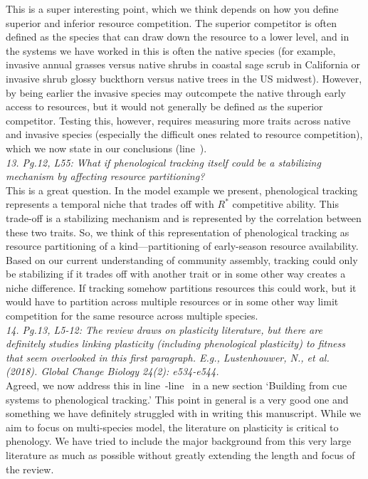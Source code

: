 \documentclass[11pt]{article}
\newcommand{\lr}[1]{line~\lineref{#1}}
\begin{document}
This is a super interesting point, which we think depends on how you define superior and inferior resource competition. The superior competitor is often defined as the species that can draw down the resource to a lower level, and in the systems we have worked in this is often the native species (for example, invasive annual grasses versus native shrubs in coastal sage scrub in California or invasive shrub glossy buckthorn versus native trees in the US midwest). However, by being earlier the invasive species may outcompete the native through early access to resources, but it would not generally be defined as the superior competitor. Testing this, however, requires measuring more traits across native and invasive species (especially the difficult ones related to resource competition), which we now state in our conclusions (\lr{r2invas}).\\

\emph{13.     Pg.12, L55: What if phenological tracking itself could be a stabilizing mechanism by
affecting resource partitioning?}\\

This is a great question. In the model example we present, phenological tracking represents a temporal niche that trades off with $R^*$ competitive ability.  This trade-off is a stabilizing mechanism and is represented by the correlation between these two traits.  So, we think of this representation of phenological tracking as resource partitioning of a kind---partitioning of early-season resource availability.   Based on our current understanding of community assembly, tracking could only be stabilizing if it trades off with another trait or in some other way creates a niche difference. If tracking somehow partitions resources this could work, but it would have to partition across multiple resources or in some other way limit competition for the same resource across multiple species.  \\

\emph{14.     Pg.13, L5-12: The review draws on plasticity literature, but there are definitely
studies linking plasticity (including phenological plasticity) to fitness that seem
overlooked in this first paragraph. E.g., Lustenhouwer, N., et al. (2018). Global Change
Biology 24(2): e534-e544.}\\

Agreed, we now address this in \lr{r2hertiable}-\lr{r2hertiableend} in a new section `Building from cue systems to phenological tracking.' This point in general is a very good one and something we have definitely struggled with in writing this manuscript. While we aim to focus on multi-species model, the literature on plasticity is critical to phenology. We have tried to include the major background from this very large literature as much as possible without greatly extending the length and focus of the review. \\
\end{document}
